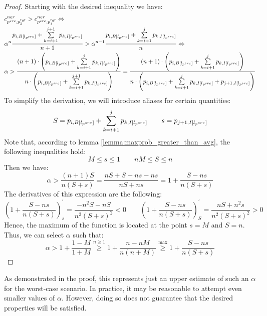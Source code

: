 \begin{proof}
  Starting with the desired inequality we have:
  \begin{align*}
    & c_{p^{src}, p_2^{tgt}}^{ner} > c_{p^{src}, p_1^{tgt}}^{ner} \Leftrightarrow \\
    & \alpha^{n}
    \frac{
      p_{i, B[l_{p^{src}}]} +
      \sum\limits_{k = i + 1}^{j + 1} p_{k, I[l_{p^{src}}]}
    }
    {n + 1} >
    \alpha^{n - 1}
    \frac{
      p_{i, B[l_{p^{src}}]} +
      \sum\limits_{k = i + 1}^{j} p_{k, I[l_{p^{src}}]}
    }
    {n}
    \Leftrightarrow                                                                \\
    & \alpha >
    \frac
    {(n+1) \cdot \left( p_{i, B[l_{p^{src}}]} +
    \sum\limits_{k = i + 1}^{j} p_{k, I[l_{p^{src}}]} \right)}
    {
      n \cdot \left( p_{i, B[l_{p^{src}}]} +
    \sum\limits_{k = i + 1}^{j + 1} p_{k, I[l_{p^{src}}]} \right)}
    =
    \frac
    {(n+1) \cdot \left( p_{i, B[l_{p^{src}}]} +
    \sum\limits_{k = i + 1}^{j} p_{k, I[l_{p^{src}}]} \right)}
    {
      n \cdot \left( p_{i, B[l_{p^{src}}]} +
    \sum\limits_{k = i + 1}^{j} p_{k, I[l_{p^{src}}]} + p_{j+1, I[l_{p^{src}}]} \right)}
  \end{align*}
  To simplify the derivation, we will introduce aliases for certain quantities:
  \[
    S = p_{i, B[l_{p^{src}}]}  + \sum\limits_{k = i + 1}^{j} p_{k, I[l_{p^{src}}]} \qquad
    s = p_{j+1, I[l_{p^{src}}]}
  \]
  Note that, according to lemma \ref{lemma:maxprob_greater_than_avg},
  the following inequalities hold:
  \begin{equation} \label{eq:ner_sum_ineq}
    M \leq s \leq 1 \qquad nM \leq S \leq n
  \end{equation}
  Then we have:
  \begin{equation*}
    \alpha > \frac{(n + 1) S}{n (S + s)} =
    \frac{nS + S + ns - ns}{nS + ns} =
    1 + \frac{S - ns}{n(S + s)}
  \end{equation*}
  The derivatives of this expression are the following:
  \begin{equation*}
    \left( 1 + \frac{S - ns}{n(S + s)} \right)_s^{'} =
    \frac{-n^2S - nS}{n^2 (S + s)^2} < 0
    \qquad
    \left( 1 + \frac{S - ns}{n(S + s)} \right)_S^{'}
    = \frac{nS + n^2s}{n^2 (S + s)^2} > 0
  \end{equation*}
  Hence, the maximum of the function is located at the point \( s = M \) and
  \( S = n \). Thus, we can select \( \alpha \) such that:
  \begin{equation*}
    \alpha > 1 + \frac{1 - M}{1 + M}
    \stackrel{n \geq 1}{\geq}
    1 + \frac{n - nM}{n(n + M)}
    \stackrel{\max}{\geq}
    1 + \frac{S - ns}{n(S + s)}
  \end{equation*}
\end{proof}
As demonstrated in the proof, this represents just an upper estimate of such an
\( \alpha \) for the worst-case scenario. In practice, it may be reasonable to attempt
even smaller values of \( \alpha \). However, doing so does not guarantee that the
desired properties will be satisfied.

